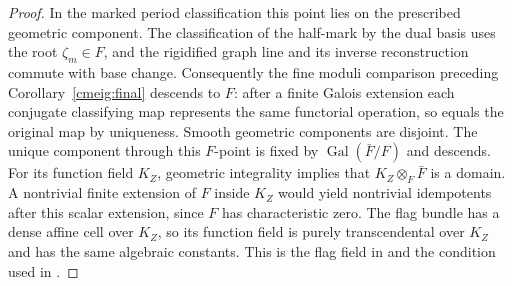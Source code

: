 \begin{proof}
In the marked period classification this point lies on the
prescribed geometric component. The classification of the
half-mark by the dual basis uses the root \(\zeta_m\in F\), and
the rigidified graph line and its inverse reconstruction commute
with base change. Consequently the fine moduli comparison preceding
Corollary~\ref{cmeig:final} descends to \(F\): after a finite Galois
extension each conjugate classifying map represents the same
functorial operation, so equals the original map by uniqueness.
Smooth geometric components are disjoint. The unique component
through this \(F\)-point is fixed by \(\operatorname{Gal}(\bar F/F)\)
and descends. For its function field \(K_Z\), geometric integrality
implies that \(K_Z\otimes_F\bar F\) is a domain. A nontrivial
finite extension of \(F\) inside \(K_Z\) would yield nontrivial
idempotents after this scalar extension, since \(F\) has
characteristic zero. The flag bundle has a dense affine cell over
\(K_Z\), so its function field is purely transcendental over \(K_Z\)
and has the same algebraic constants. This is the flag field in
and the condition used in
.
\end{proof}

